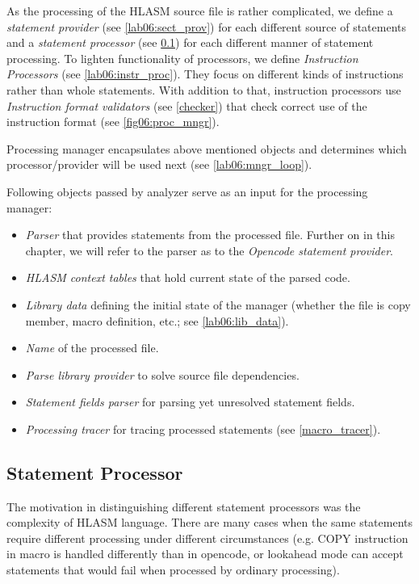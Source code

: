 As the processing of the HLASM source file is rather complicated, we define a \emph{statement provider} (see \cref{lab06:sect_prov}) for each different source of statements and a \emph{statement processor} (see \cref{lab06:sect_proc}) for each different manner of statement processing. To lighten functionality of processors, we define \emph{Instruction Processors} (see \cref{lab06:instr_proc}). They focus on different kinds of instructions rather than whole statements. With addition to that, instruction processors use \emph{Instruction format validators}  (see \cref{checker}) that check correct use of the instruction format (see \cref{fig06:proc_mngr}).

Processing manager encapsulates above mentioned objects and determines which processor/provider will be used next (see \cref{lab06:mngr_loop}).

Following objects passed by analyzer serve as an input for the processing manager:
\begin{itemize}
	\item \emph{Parser} that provides statements from the processed file. Further on in this chapter, we will refer to the parser as to the \emph{Opencode statement provider}.
	\item \emph{HLASM context tables} that hold current state of the parsed code.
	\item \emph{Library data} defining the initial state of the manager (whether the file is copy member, macro definition, etc.; see \cref{lab06:lib_data}). 
	\item \emph{Name} of the processed file.
	\item \emph{Parse library provider} to solve source file dependencies.
	\item \emph{Statement fields parser} for parsing yet unresolved statement fields. 
	\item \emph{Processing tracer} for tracing processed statements (see \cref{macro_tracer}).
\end{itemize}

\subsection{Statement Processor}
\label{lab06:sect_proc}


The motivation in distinguishing different statement processors was the complexity of HLASM language. There are many cases when the same statements require different processing under different circumstances (e.g. COPY instruction in macro is handled differently than in opencode, or lookahead mode can accept statements that would fail when processed by ordinary processing).

